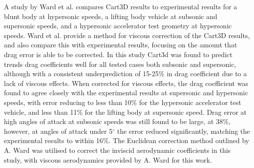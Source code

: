 A study by Ward et al.\cite{Ward2018} compares Cart3D results to experimental results for a blunt body at hypersonic speeds, a lifting body vehicle at subsonic and supersonic speeds, and a hypersonic accelerator test geometry at hypersonic speeds. Ward et al. provide a method for viscous correction of the Cart3D results, and also compare this with experimental results, focusing on the amount that drag error is able to be corrected. In this study Cart3d was found to predict trends drag coefficients well for all tested cases both subsonic and supersonic, although with a consistent underprediction of 15-25\% in drag coefficient due to a lack of viscous effects\cite{Ward2018}. When corrected for viscous effects, the drag coefficient was found to agree closely with the experimental results at supersonic and hypersonic speeds, with error reducing to less than 10\% for the hypersonic accelerator test vehicle, and less than 11\% for the lifting body at supersonic speed\cite{Ward2018}. Drag error at high angles of attack at subsonic speeds was still found to be large, at 38\%, however, at angles of attack under 5$^\circ$ the error reduced significantly, matching the experimental results to within 16\%. 
The Euclidean correction method outlined by A. Ward was utilised to correct the inviscid aerodynamic coefficients in this study, with viscous aerodynamics provided by A. Ward for this work. 


